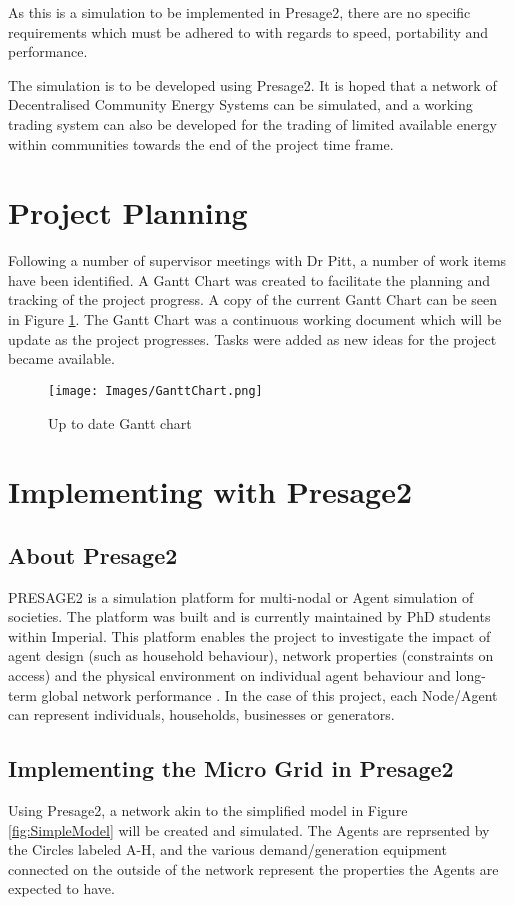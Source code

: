 \documentclass{article}
\begin{document}
As this is a simulation to be implemented in Presage2, there are no specific requirements which must be adhered to with regards to speed, portability and performance.  

The simulation is to be developed using Presage2. It is hoped that a network of Decentralised Community Energy Systems can be simulated, and a working trading system can also be developed for the trading of limited available energy within communities towards the end of the project time frame. 


\section{Project Planning}
Following a number of supervisor meetings with Dr Pitt, a number of work items have been identified. A Gantt Chart was created to facilitate the planning and tracking of the project progress. A copy of the current Gantt Chart can be seen in Figure \ref{fig:GanttChart}. The Gantt Chart was a continuous working document which will be update as the project progresses. Tasks were added as new ideas for the project became available. 

\begin{figure}[h!]
\centering
\texttt{[image: Images/GanttChart.png]}
\caption{Up to date Gantt chart}
\label{fig:GanttChart}
\end{figure}

\clearpage

\section{Implementing with Presage2}
\subsection{About Presage2}
PRESAGE2 is a simulation platform for multi-nodal or Agent simulation of societies. The platform was built and is currently maintained by PhD students within Imperial. This platform enables the project to investigate the impact of agent design (such as household behaviour), network properties (constraints on access) and the physical environment on individual agent behaviour and long-term global network performance \cite{Presage2-Desc:2015}. In the case of this project, each Node/Agent can represent individuals, households, businesses or generators. 

\subsection{Implementing the Micro Grid in Presage2}
Using Presage2, a network akin to the simplified model in Figure \ref{fig:SimpleModel} will be created and simulated. The Agents are reprsented by the Circles labeled A-H, and the various demand/generation equipment connected on the outside of the network represent the properties the Agents are expected to have.
\end{document}
